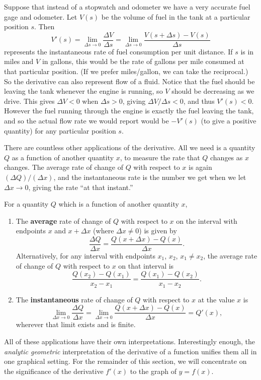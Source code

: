 \bex
Suppose that instead of a stopwatch and odometer we have
a very accurate fuel gage and odometer.  
Let $V(s)$ be the volume of fuel in the tank at a 
particular position $s$.  Then
$$V'(s)=
\lim_{\Delta s\to0}\frac{\Delta V}{\Delta s}=
\lim_{\Delta s\to0}\frac{V(s+\Delta s)-V(s)}{\Delta s}$$
represents the instantaneous rate of fuel consumption per unit 
distance.  If $s$ is in miles and $V$ in gallons, this
would be the rate of gallons per mile consumed at that
particular position.  (If we prefer miles/gallon, we
can take the reciprocal.)  So the derivative can also 
represent flow of a fluid.  Notice that the fuel should 
be leaving the tank whenever the engine is running, 
so $V$ should be decreasing as we drive.
This gives  $\Delta V<0$ when $\Delta s>0$,
giving $\Delta V/\Delta s<0$,  and thus $V'(s)<0$.
However the fuel running through the engine is
exactly the fuel leaving the tank, and so the 
actual flow rate we would report would be $-V'(s)$
(to give a positive quantity) for any particular
position $s$.
\eex

There are countless other applications of the derivative.
All we need is a quantity $Q$ as a function of another quantity
 $x$, to
measure the rate that $Q$ changes as $x$ changes.
The average rate of change of $Q$ with respect to $x$
is again $(\Delta Q)/(\Delta x)$, and the instantaneous
rate is the number we get when we let $\Delta x\to0$,
giving the rate ``at that instant.''
\begin{definition}
For a quantity $Q$ which is a function of another quantity $x$,
\begin{enumerate}
\item The {\bf average} rate of change of $Q$ with respect
to $x$ on the interval with endpoints $x$ and $x+\Delta x$
(where $\Delta x\ne0$)
is given by
\begin{equation}\frac{\Delta Q}{\Delta x}=\frac{Q(x+\Delta x)-Q(x)}{\Delta x}.
\end{equation}
Alternatively, for any interval with endpoints $x_1$, $x_2$, $x_1\ne x_2$,
the average rate of change of $Q$ with respect to $x$ on that interval 
is 
\begin{equation}\frac{Q(x_2)-Q(x_1)}{x_2-x_1}
=\frac{Q(x_1)-Q(x_2)}{x_1-x_2}.\end{equation}
\item The {\bf instantaneous} rate of change of $Q$ with 
respect to $x$ at the value $x$ is
\begin{equation}
\lim_{\Delta x\to0}\frac{\Delta Q}{\Delta x}
=\lim_{\Delta x\to0}\frac{Q(x+\Delta x)-Q(x)}{\Delta x}=Q'(x),
\end{equation} wherever that limit exists and is finite.\end{enumerate}

\end{definition}
All of these applications have their own interpretations.
Interestingly enough, the {\it analytic geometric} interpretation
of the derivative of a function unifies them all
in one graphical setting.  For the remainder of this
section, we will concentrate on the significance
of the derivative $f'(x)$ to the graph of $y=f(x)$.

